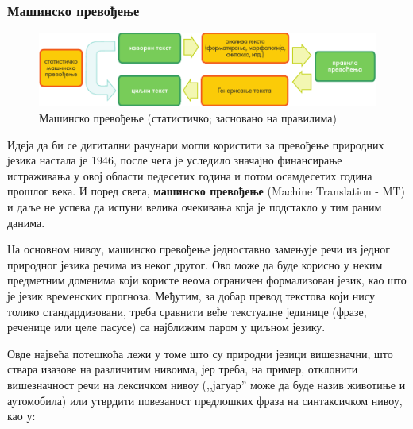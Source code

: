 {\begin{multicols}{2}
 \subsubsection {Машинско превођење}
   

\begin{figure}[htb]
  \center
  \includegraphics[width=\textwidth]{../_media/serbian/machine_translation}
  \caption{Машинско превођење (статистичко; засновано на правилима)}
  \label{fig:mtarch_sr}
\end{figure}

Идеја да би се дигитални рачунари могли користити за превођење природних језика настала је 1946, после чега је уследило значајно финансирање истраживања у овој области педесетих година и потом осамдесетих година прошлог века. И поред свега, \textbf{машинско превођење} (Machine Translation - MT) и даље не успева да испуни велика очекивања која је подстакло у тим раним данима. 


На основном нивоу, машинско превођење једноставно замењује речи из једног природног језика речима из неког другог. Ово може да буде корисно у неким предметним доменима који користе веома ограничен формализован језик, као што је језик временских прогноза. Међутим, за добар превод текстова који нису толико стандардизовани, треба сравнити веће текстуалне јединице (фразе, реченице или целе пасусе) са најближим паром у циљном језику. 

Овде највећа потешкоћа лежи у томе што су природни језици вишезначни, што ствара изазове на различитим нивоима, јер треба, на пример, отклонити вишезначност речи на лексичком нивоу (,,јагуар'' може да буде назив животиње и аутомобила) или утврдити повезаност предлошких фраза на синтаксичком нивоу, као у:


\end{multicols}}
